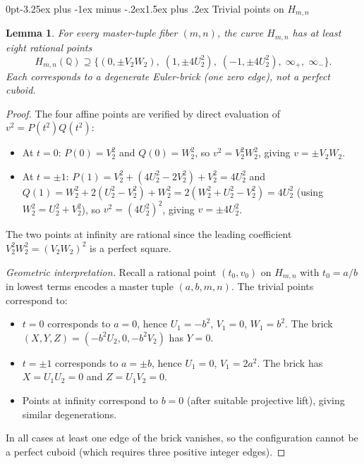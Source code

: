 \documentclass[12pt,a4paper,reqno]{amsart}
\makeatletter
\renewcommand{\subsection}{\@startsection{subsection}{2}%
  {0pt}{-3.25ex plus -1ex minus -.2ex}{1.5ex plus .2ex}%
  {\normalfont\normalsize\bfseries}}
\theoremstyle{plain}
\newtheorem{lemma}[theorem]{Lemma}
\theoremstyle{definition}
\theoremstyle{remark}
\newcommand{\Q}{\mathbb{Q}}
\newcommand{\HC}{H_{m,n}}
\makeatother
\begin{document}
\subsection{Trivial points on $\HC$}

\begin{lemma}
\label{lem:trivial}
For every master-tuple fiber $(m, n)$, the curve $\HC$ has at least eight rational points
$$
\HC(\Q) \supseteq \{(0, \pm V_2 W_2), \; (1, \pm 4 U_2^2), \; (-1, \pm 4 U_2^2), \; \infty_+, \; \infty_-\}.
$$
Each corresponds to a degenerate Euler-brick (one zero edge), not a perfect cuboid.
\end{lemma}

\begin{proof}
The four affine points are verified by direct evaluation of $v^2 = P(t^2) Q(t^2)$:
\begin{itemize}[leftmargin=2em]
    \item At $t = 0$: $P(0) = V_2^2$ and $Q(0) = W_2^2$, so $v^2 = V_2^2 W_2^2$, giving $v = \pm V_2 W_2$.
    \item At $t = \pm 1$: $P(1) = V_2^2 + (4 U_2^2 - 2 V_2^2) + V_2^2 = 4 U_2^2$ and $Q(1) = W_2^2 + 2(U_2^2 - V_2^2) + W_2^2 = 2(W_2^2 + U_2^2 - V_2^2) = 4 U_2^2$ (using $W_2^2 = U_2^2 + V_2^2$), so $v^2 = (4 U_2^2)^2$, giving $v = \pm 4 U_2^2$.
\end{itemize}
The two points at infinity are rational since the leading coefficient $V_2^2 W_2^2 = (V_2 W_2)^2$ is a perfect square.

\emph{Geometric interpretation.} Recall a rational point $(t_0, v_0)$ on $\HC$ with $t_0 = a/b$ in lowest terms encodes a master tuple $(a, b, m, n)$. The trivial points correspond to:
\begin{itemize}[leftmargin=2em]
    \item $t = 0$ corresponds to $a = 0$, hence $U_1 = -b^2$, $V_1 = 0$, $W_1 = b^2$. The brick $(X, Y, Z) = (-b^2 U_2, 0, -b^2 V_2)$ has $Y = 0$.
    \item $t = \pm 1$ corresponds to $a = \pm b$, hence $U_1 = 0$, $V_1 = 2 a^2$. The brick has $X = U_1 U_2 = 0$ and $Z = U_1 V_2 = 0$.
    \item Points at infinity correspond to $b = 0$ (after suitable projective lift), giving similar degenerations.
\end{itemize}
In all cases at least one edge of the brick vanishes, so the configuration cannot be a perfect cuboid (which requires three positive integer edges).
\end{proof}
\end{document}

